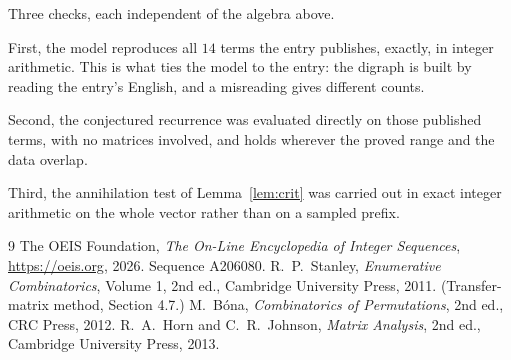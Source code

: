 \documentclass[11pt,a4paper]{article}
\theoremstyle{plain}
\theoremstyle{definition}
\begin{document}
Three checks, each independent of the algebra above.

First, the model reproduces all $14$ terms the entry publishes, exactly, in integer
arithmetic. This is what ties the model to the entry: the digraph is built by reading the
entry's English, and a misreading gives different counts.

Second, the conjectured recurrence was evaluated directly on those published terms, with no
matrices involved, and holds wherever the proved range and the data overlap.

Third, the annihilation test of Lemma~\ref{lem:crit} was carried out in exact integer
arithmetic on the whole vector rather than on a sampled prefix.

\begin{thebibliography}{9}
 The OEIS Foundation, \emph{The On-Line Encyclopedia of Integer
Sequences}, \url{https://oeis.org}, 2026. Sequence A206080.
 R.~P.~Stanley, \emph{Enumerative Combinatorics}, Volume 1, 2nd ed.,
Cambridge University Press, 2011. (Transfer-matrix method, Section 4.7.)
 M.~B\'ona, \emph{Combinatorics of Permutations}, 2nd ed., CRC
Press, 2012.
 R.~A.~Horn and C.~R.~Johnson, \emph{Matrix Analysis}, 2nd ed., Cambridge
University Press, 2013.
\end{thebibliography}
\end{document}
